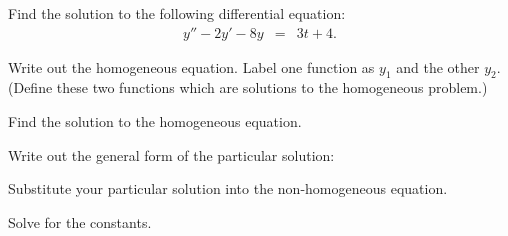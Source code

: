   \begin{problem}
  \item Find the solution to the following differential equation:
    \begin{eqnarray}
      y'' - 2y' - 8y & = & 3t + 4.
      \label{eqn:secondOrderExample}
    \end{eqnarray}
    \begin{subproblem}
    \item Write out the homogeneous equation. Label one function as
      $y_1$ and the other $y_2$. (Define these two functions which are
      solutions to the homogeneous problem.)
      \vspace{2em}
    \item Find the solution to the homogeneous equation.
      \vfill

    \clearpage

  \item Write out the general form of the particular solution:
    \vspace{4em}

  \item Substitute your particular solution into the non-homogeneous equation.
    \vfill

  \item Solve for the constants.
    \vfill


  \end{subproblem}

  \end{problem}

